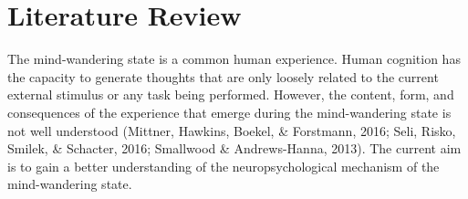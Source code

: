 \chapter{Literature Review}
\label{ch:litreviews}

\newpage

The mind-wandering state is a common human experience. Human cognition has the capacity to generate thoughts that are only loosely related to the current external stimulus or any task being performed. However, the content, form, and consequences of the experience that emerge during the mind-wandering state is not well understood (Mittner, Hawkins, Boekel, \& Forstmann, 2016; Seli, Risko, Smilek, \& Schacter, 2016; Smallwood \& Andrews-Hanna, 2013). The current aim is to gain a better understanding of the neuropsychological mechanism of the mind-wandering state.



